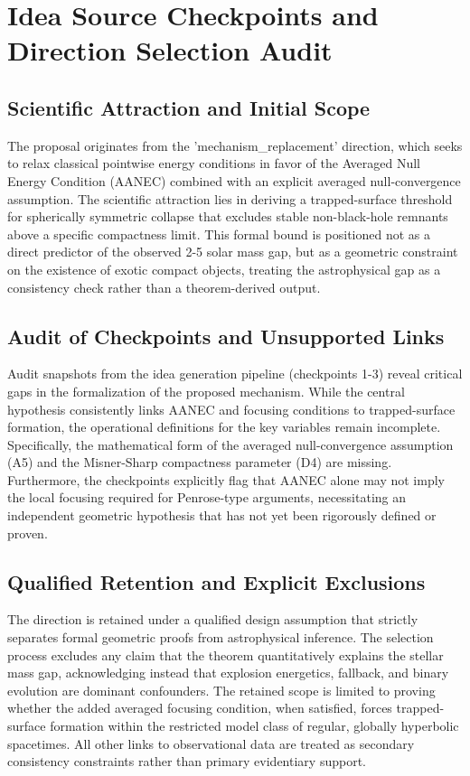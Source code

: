 \documentclass[conference]{IEEEtran}
\begin{document}
\section{Idea Source Checkpoints and Direction Selection Audit}
\subsection{Scientific Attraction and Initial Scope}
The proposal originates from the 'mechanism\_replacement' direction, which seeks to relax classical pointwise energy conditions in favor of the Averaged Null Energy Condition (AANEC) combined with an explicit averaged null-convergence assumption. The scientific attraction lies in deriving a trapped-surface threshold for spherically symmetric collapse that excludes stable non-black-hole remnants above a specific compactness limit. This formal bound is positioned not as a direct predictor of the observed 2-5 solar mass gap, but as a geometric constraint on the existence of exotic compact objects, treating the astrophysical gap as a consistency check rather than a theorem-derived output.

\subsection{Audit of Checkpoints and Unsupported Links}
Audit snapshots from the idea generation pipeline (checkpoints 1-3) reveal critical gaps in the formalization of the proposed mechanism. While the central hypothesis consistently links AANEC and focusing conditions to trapped-surface formation, the operational definitions for the key variables remain incomplete. Specifically, the mathematical form of the averaged null-convergence assumption (A5) and the Misner-Sharp compactness parameter (D4) are missing. Furthermore, the checkpoints explicitly flag that AANEC alone may not imply the local focusing required for Penrose-type arguments, necessitating an independent geometric hypothesis that has not yet been rigorously defined or proven.

\subsection{Qualified Retention and Explicit Exclusions}
The direction is retained under a qualified design assumption that strictly separates formal geometric proofs from astrophysical inference. The selection process excludes any claim that the theorem quantitatively explains the stellar mass gap, acknowledging instead that explosion energetics, fallback, and binary evolution are dominant confounders. The retained scope is limited to proving whether the added averaged focusing condition, when satisfied, forces trapped-surface formation within the restricted model class of regular, globally hyperbolic spacetimes. All other links to observational data are treated as secondary consistency constraints rather than primary evidentiary support.
\end{document}
